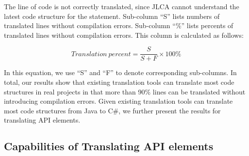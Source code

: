 The line of code is not correctly translated, since JLCA cannot understand the latest code structure for the  statement. Sub-column ``S'' lists numbers of translated lines without compilation errors. Sub-column ``\%'' lists percents of translated lines without compilation errors. This column is calculated as follows:

\begin{equation}\label{eq-correctpercent}
Translation\ percent=\frac{S}{S+F}\times 100\%
\end{equation}%

In this equation, we use ``S'' and ``F'' to denote corresponding sub-columns. In total, our results show that existing translation tools can translate most code structures in real projects in that more than 90\% lines can be translated without introducing compilation errors. Given existing translation tools can translate most code structures from Java to C\#, we further present the results for translating API elements.

\subsection{Capabilities of Translating API elements}
\label{sec:real:api}

